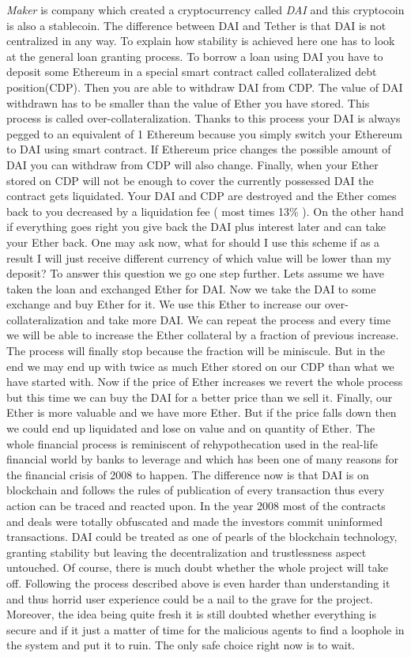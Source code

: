 \documentclass[a4paper,12pt,twoside,openany]{report}
\begin{document}
\textit{Maker} is company which created a cryptocurrency called \textit{DAI} \cite{makerdao} and this cryptocoin is also a stablecoin. The difference between DAI and Tether is that DAI is not centralized in any way. To explain how stability is achieved here one has to look at the general loan granting process. To borrow a loan using DAI you have to deposit some Ethereum in a special smart contract called collateralized debt position(CDP). Then you are able to withdraw DAI from CDP. The value of DAI withdrawn has to be smaller than the value of Ether you have stored. This process is called over-collateralization. Thanks to this process your DAI is always pegged to an equivalent of 1 Ethereum because you simply switch your Ethereum to DAI using smart contract. If Ethereum price changes the possible amount of DAI you can withdraw from CDP will also change. Finally, when your Ether stored on CDP will not be enough to cover the currently possessed DAI the contract gets liquidated. Your DAI and CDP are destroyed and the Ether comes back to you decreased by a liquidation fee ( most times 13\% ). On the other hand if everything goes right you give back the DAI plus interest later and can take your Ether back. One may ask now, what for should I use this scheme if as a result I will just receive different currency of which value will be lower than my deposit? To answer this question we go one step further. Lets assume we have taken the loan and exchanged Ether for DAI. Now we take the DAI to some exchange and buy Ether for it. We use this Ether to increase our over-collateralization and take more DAI. We can repeat the process and every time we will be able to increase the Ether collateral by a fraction of previous increase. The process will finally stop because the fraction will be miniscule. But in the end we may end up with twice as much Ether stored on our CDP than what we have started with. Now if the price of Ether increases we revert the whole process but this time we can buy the DAI for a better price than we sell it. Finally, our Ether is more valuable and we have more Ether. But if the price falls down then we could end up liquidated and lose on value and on quantity of Ether. The whole financial process is reminiscent of rehypothecation used in the real-life financial world by banks to leverage and which has been one of many reasons for the financial crisis of 2008 to happen. The difference now is that DAI is on blockchain and follows the rules of publication of every transaction thus every action can be traced and reacted upon. In the year 2008 most of the contracts and deals were totally obfuscated and made the investors commit uninformed transactions. DAI could be treated as one of pearls of the blockchain technology, granting stability but leaving the decentralization and trustlessness aspect untouched. Of course, there is much doubt whether the whole project will take off. Following the process described above is even harder than understanding it and thus horrid user experience could be a nail to the grave for the project. Moreover, the idea being quite fresh it is still doubted whether everything is secure and if it just a matter of time for the malicious agents to find a loophole in the system and put it to ruin. The only safe choice right now is to wait.
\end{document}
